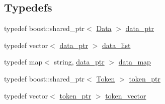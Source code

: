 \subsection*{Typedefs}
\begin{DoxyCompactItemize}
\item 
typedef boost\+::shared\+\_\+ptr$<$ \hyperlink{classxtd_1_1network_1_1http_1_1cpptempl_1_1Data}{Data} $>$ \hyperlink{namespacextd_1_1network_1_1http_1_1cpptempl_ad2f49991f1902699a98cf62bf0ae7ce6}{data\+\_\+ptr}
\item 
typedef vector$<$ \hyperlink{namespacextd_1_1network_1_1http_1_1cpptempl_ad2f49991f1902699a98cf62bf0ae7ce6}{data\+\_\+ptr} $>$ \hyperlink{namespacextd_1_1network_1_1http_1_1cpptempl_aff1b51bcf8064f69c85dd4833c1853b4}{data\+\_\+list}
\item 
typedef map$<$ string, \hyperlink{namespacextd_1_1network_1_1http_1_1cpptempl_ad2f49991f1902699a98cf62bf0ae7ce6}{data\+\_\+ptr} $>$ \hyperlink{namespacextd_1_1network_1_1http_1_1cpptempl_a638d1d81c8fb63c0bbafd508d6a2a007}{data\+\_\+map}
\item 
typedef boost\+::shared\+\_\+ptr$<$ \hyperlink{classxtd_1_1network_1_1http_1_1cpptempl_1_1Token}{Token} $>$ \hyperlink{namespacextd_1_1network_1_1http_1_1cpptempl_a09d1bd238d03342e60f0c20c679c0c88}{token\+\_\+ptr}
\item 
typedef vector$<$ \hyperlink{namespacextd_1_1network_1_1http_1_1cpptempl_a09d1bd238d03342e60f0c20c679c0c88}{token\+\_\+ptr} $>$ \hyperlink{namespacextd_1_1network_1_1http_1_1cpptempl_a38606cfbbfe81ed46ea9b0cf064de956}{token\+\_\+vector}
\end{DoxyCompactItemize}
